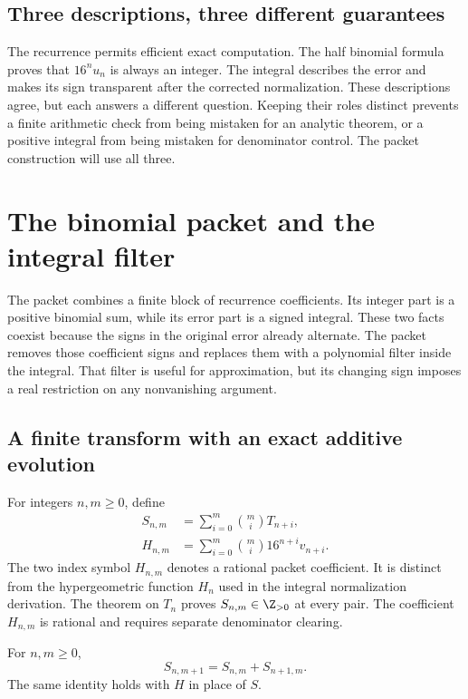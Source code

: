 \section{Three descriptions, three different guarantees}

The recurrence permits efficient exact computation. The half binomial
formula proves that $16^nu_n$ is always an integer. The integral describes
the error and makes its sign transparent after the corrected normalization.
These descriptions agree, but each answers a different question. Keeping
their roles distinct prevents a finite arithmetic check from being mistaken
for an analytic theorem, or a positive integral from being mistaken for
denominator control. The packet construction will use all three.

\chapter{The binomial packet and the integral filter}
\label{cb_ch_packets}

The packet combines a finite block of recurrence coefficients. Its integer
part is a positive binomial sum, while its error part is a signed integral.
These two facts coexist because the signs in the original error already
alternate. The packet removes those coefficient signs and replaces them
with a polynomial filter inside the integral. That filter is useful for
approximation, but its changing sign imposes a real restriction on any
nonvanishing argument.

\section{A finite transform with an exact additive evolution}

For integers $n,m\geq0$, define
\begin{align}
 S_{n,m}&=\sum_{i=0}^m\binom miT_{n+i},\label{cb_eq_S_def}\\
 H_{n,m}&=\sum_{i=0}^m\binom mi16^{n+i}v_{n+i}.
 \label{cb_eq_H_packet_def}
\end{align}
The two index symbol $H_{n,m}$ denotes a rational packet coefficient. It is
distinct from the hypergeometric function $H_n$ used in the integral
normalization derivation. The theorem on $T_n$ proves
$S_{n,m}\in\Z_{>0}$ at every pair. The coefficient $H_{n,m}$ is rational
and requires separate denominator clearing.

\begin{proposition}\label{cb_prop_Pascal}
For $n,m\geq0$,
\begin{equation}\label{cb_eq_Pascal}
 S_{n,m+1}=S_{n,m}+S_{n+1,m}.
\end{equation}
The same identity holds with $H$ in place of $S$.
\end{proposition}

